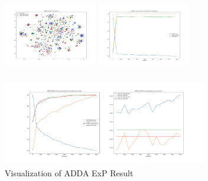 \documentclass[conference]{IEEEtran}
\begin{document}
\begin{figure}[htb]

\centering
\begin{minipage}[t]{0.26\textwidth}
\includegraphics[width=1.6in, height=1.5in]{Ladda/std_P2R/ADDA_visual.png}
\end{minipage}%
\begin{minipage}[t]{0.26\textwidth}
\includegraphics[width=1.6in, height=1.5in]{Ladda/std_P2R/clf.png}
\end{minipage}%
\begin{minipage}[t]{0.45\textwidth}
\includegraphics[width=3.5in, height=1.5in]{Ladda/std_P2R/gan.png}
\end{minipage}%
\caption{Visualization of ADDA ExP Result}\label{fig:ExP}
\end{figure}
\end{document}
